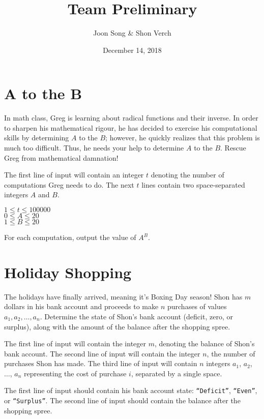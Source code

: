 \documentclass{problem-set}
\title{Team Preliminary \RNum{1}}
\date{December 14, 2018}
\author{Joon Song & Shon Verch}
\begin{document}
\maketitle

\section{$\boldsymbol{A}$ to the $\boldsymbol{B}$}

In math class, Greg is learning about radical functions and their inverse. In order to sharpen his mathematical rigour, he has decided to exercise his computational skills by determining $A$ to the $B$; however, he quickly realizes that this problem is much too difficult. Thus, he needs your help to determine $A$ to the $B$. Rescue Greg from mathematical damnation!

The first line of input will contain an integer $t$ denoting the number of computations Greg needs to do. The next $t$ lines contain two space-separated integers $A$ and $B$.

\constraints
$1 \leq t \leq 100000$\\
$0 \leq A \leq 20$\\
$1 \leq B \leq 20$

\outputformat
For each computation, output the value of $A^B$.


\newpage
\section{Holiday Shopping}
The holidays have finally arrived, meaning it's Boxing Day season! Shon has $m$ dollars in his bank account and proceeds to make $n$ purchases of values $a_1, a_2, \dots, a_n$. Determine the state of Shon's bank account (deficit, zero, or surplus), along with the amount of the balance after the shopping spree.

The first line of input will contain the integer $m$, denoting the balance of Shon's bank account. The second line of input will contain the integer $n$, the number of purchases Shon has made. The third line of input will contain $n$ integers $a_1$, $a_2$, $\ldots$, $a_n$ representing the cost of purchase $i$, separated by a single space.

\outputformat
The first line of input should contain his bank account state: \texttt{``Deficit''}, \texttt{``Even''}, or \texttt{``Surplus''}. The second line of input should contain the balance after the shopping spree.
\end{document}
